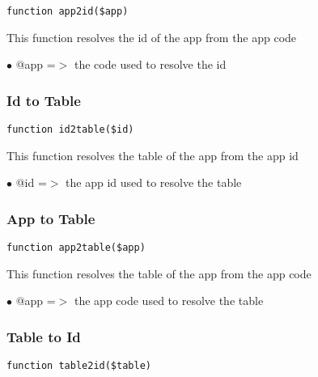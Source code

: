 \documentclass[a4paper]{article}
\begin{document}
\begin{lstlisting}
function app2id($app)
\end{lstlisting}

This function resolves the id of the app from the app code

\begin{compactitem}
\item[\color{myblue}$\bullet$] @app =$>$ the code used to resolve the id
\end{compactitem}

\hypertarget{toc19}{}
\subsubsection{Id to Table}

\begin{lstlisting}
function id2table($id)
\end{lstlisting}

This function resolves the table of the app from the app id

\begin{compactitem}
\item[\color{myblue}$\bullet$] @id =$>$ the app id used to resolve the table
\end{compactitem}

\hypertarget{toc20}{}
\subsubsection{App to Table}

\begin{lstlisting}
function app2table($app)
\end{lstlisting}

This function resolves the table of the app from the app code

\begin{compactitem}
\item[\color{myblue}$\bullet$] @app =$>$ the app code used to resolve the table
\end{compactitem}

\hypertarget{toc21}{}
\subsubsection{Table to Id}

\begin{lstlisting}
function table2id($table)
\end{lstlisting}
\end{document}
